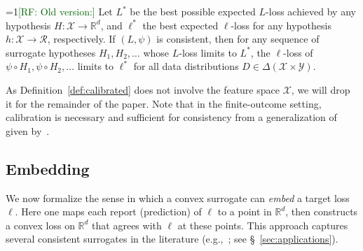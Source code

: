 \documentclass[11pt]{article}
\newcommand{\Comments}{1}
\newcommand{\mynote}[2]{\ifnum\Comments=1\textcolor{#1}{#2}\fi}
\newcommand{\raf}[1]{\mynote{darkgreen}{[RF: #1]}}
\newcommand{\reals}{\mathbb{R}}
\newcommand{\R}{\mathcal{R}}
\newcommand{\Sc}{\mathcal{S}}
\newcommand{\X}{\mathcal{X}}
\newcommand{\Y}{\mathcal{Y}}
\begin{document}
\raf{Old version:}
Let $L^*$ be the best possible expected $L$-loss achieved by any hypothesis $H:\X\to\reals^d$, and $\ell^*$ the best expected $\ell$-loss for any hypothesis $h:\X\to\R$, respectively.
If $(L,\psi)$ is consistent, then for any sequence of surrogate hypotheses $H_1,H_2,\ldots$ whose $L$-loss limits to $L^*$, the $\ell$-loss of $\psi\circ H_1,\psi \circ H_2, \ldots$ limits to $\ell^*$ for all data distributions $D \in \Delta(\X \times \Y)$.

As Definition~\ref{def:calibrated} does not involve the feature space $\X$, we will drop it for the remainder of the paper.
Note that in the finite-outcome setting, calibration is necessary and sufficient for consistency from a generalization of~\citet{tewari2007consistency} given by~\citet{ramaswamy2016convex}.  


\subsection{Embedding}

We now formalize the sense in which a convex surrogate can \emph{embed} a target loss $\ell$.
Here one maps each report (prediction) of $\ell$ to a point in $\reals^d$, then constructs a convex loss on $\reals^d$ that agrees with $\ell$ at these points.
This approach captures several consistent surrogates in the literature (e.g.,~\citep{ramaswamy2015hierarchical,ramaswamy2016convex,lapin2015top,wang2020weston}; see \S~\ref{sec:applications}).
\end{document}
